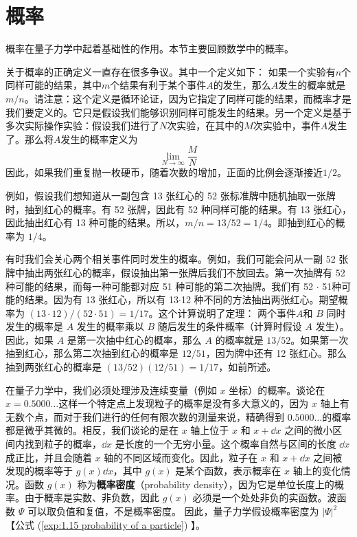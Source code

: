\section{概率}
\label{sec:1.6 Probability}

	概率在量子力学中起着基础性的作用。本节主要回顾数学中的概率。

	关于概率的正确定义一直存在很多争议。其中一个定义如下： 如果一个实验有$n$个同样可能的结果，其中$m$个结果有利于某个事件$A$的发生，那么$A$发生的概率就是$m/n$。请注意：这个定义是循环论证，因为它指定了同样可能的结果，而概率才是我们要定义的。它只是假设我们能够识别同样可能发生的结果。另一个定义是基于多次实际操作实验：假设我们进行了$N$次实验，在其中的$M$次实验中，事件$A$发生了。那么将$A$发生的概率定义为
	\begin{equation*}
		\lim\limits_{N \to \infty}\frac{M}{N}
	\end{equation*}
	因此，如果我们重复抛一枚硬币，随着次数的增加，正面的比例会逐渐接近$1/2$。

	例如，假设我们想知道从一副包含 13 张红心的 52 张标准牌中随机抽取一张牌时，抽到红心的概率。有 52 张牌，因此有 52 种同样可能的结果。有 13 张红心，因此抽出红心有 13 种可能的结果。所以，$m/n = 13/52 = 1/4$。即抽到红心的概率为 $1/4$。

	有时我们会关心两个相关事件同时发生的概率。例如，我们可能会问从一副 52 张牌中抽出两张红心的概率，假设抽出第一张牌后我们不放回去。第一次抽牌有 52 种可能的结果，而每一种可能都对应 51 种可能的第二次抽牌。我们有 52 $\cdot$ 51种可能的结果。因为有 13 张红心，所以有 13$\cdot$12 种不同的方法抽出两张红心。期望概率为 $\left(13\cdot12\right)/\left(52\cdot51\right)=1/17$。这个计算说明了定理： 两个事件$A$和 $B$ 同时发生的概率是 $A$ 发生的概率乘以 $B$ 随后发生的条件概率（计算时假设 $A$ 发生）。因此，如果 $A$ 是第一次抽中红心的概率，那么 $A$ 的概率就是 $13/52$。如果第一次抽到红心，那么第二次抽到红心的概率是 $12/51$，因为牌中还有 12 张红心。那么抽到两张红心的概率是 $\left(13/52\right)\left(12/51\right)=1/17$，如前所述。

	在量子力学中，我们必须处理涉及连续变量（例如 $x$ 坐标）的概率。谈论在 $x=0.5000\ldots$这样一个特定点上发现粒子的概率是没有多大意义的，因为 $x$ 轴上有无数个点，而对于我们进行的任何有限次数的测量来说，精确得到 $0.5000\ldots$的概率都是微乎其微的。相反，我们谈论的是在 $x$ 轴上位于 $x$ 和 $x+\dd x$ 之间的微小区间内找到粒子的概率，$\dd x$ 是长度的一个无穷小量。这个概率自然与区间的长度 $\dd x$ 成正比，并且会随着 $x$ 轴的不同区域而变化。因此，粒子在 $x$ 和 $x+\dd x$ 之间被发现的概率等于 $g\left(x\right)\dd x$，其中 $g\left(x\right)$ 是某个函数，表示概率在 $x$ 轴上的变化情况。函数 $g\left(x\right)$ 称为\textbf{概率密度}（probability density），因为它是单位长度上的概率。由于概率是实数、非负数，因此 $g\left(x\right)$ 必须是一个处处非负的实函数。波函数 $\Psi$ 可以取负值和复值，不是概率密度。 因此，量子力学假设概率密度为 $\left|\Psi\right|^2$ 【公式 (\ref{exp:1.15 probability of a particle}) 】。


